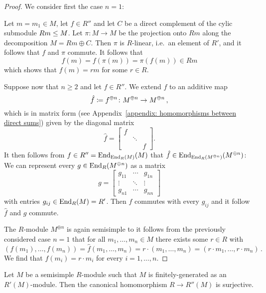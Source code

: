 \begin{proof}
  We consider first the case $n = 1$:
  
  Let $m = m_1 \in M$, let $f \in R''$ and let $C$ be a direct complement of the cylic submodule $Rm \leq M$.
  Let $\pi \colon M \to M$ be the projection onto $Rm$ along the decomposition $M = Rm \oplus C$.
  Then $\pi$ is $R$-linear, i.e.\ an element of $R'$, and it follows that $f$ and $\pi$ commute.
  It follows that
  \[
        f(m)
    =   f(\pi(m))
    =   \pi(f(m))
    \in Rm
  \]
  which shows that $f(m) = rm$ for some $r \in R$.
  
  Suppose now that $n \geq 2$ and let $f \in R''$.
  We extend $f$ to an additive map
  \[
              \hat{f}
    \coloneqq  f^{\oplus n}
    \colon    M^{\oplus n}
    \to       M^{\oplus n} \,,
  \]
  which is in matrix form (see Appendix~\ref{appendix: homomorphisms between direct sums}) given by the diagonal matrix
  \[
      \hat{f}
    = \begin{bmatrix}
        f &         &   \\  
          & \ddots  &   \\
          &         & f
      \end{bmatrix}.
  \]
  It then follows from $f \in R'' = \operatorname{End}_{\operatorname{End}_R(M)}(M)$ that $\hat{f} \in \operatorname{End}_{\operatorname{End}_R(M^{\oplus n})}(M^{\oplus n})$:
  We can represent every $g \in \operatorname{End}_R(M^{\oplus n})$ as a matrix
  \[
      g
    = \begin{bmatrix}
        g_{11}  & \cdots  & g_{1n}  \\
        \vdots  & \ddots  & \vdots  \\
        g_{n1}  & \cdots  & g_{nn}
      \end{bmatrix}
  \]
  with entries $g_{ij} \in \operatorname{End}_R(M) = R'$.
  Then $f$ commutes with every $g_{ij}$ and it follow $\hat{f}$ and $g$ commute.
  
  The $R$-module $M^{\oplus n}$ is again semisimple to it follows from the previously considered case $n = 1$ that for all $m_1, \dotsc, m_n \in M$ there exists some $r \in R$ with
  \[
      (f(m_1), \dotsc, f(m_n))
    = \hat{f}(m_1, \dotsc, m_n)
    = r \cdot (m_1, \dotsc, m_n)
    = (r \cdot m_1, \dotsc, r \cdot m_n) \,.
  \]
  We find that $f(m_i) = r \cdot m_i$ for every $i = 1, \dotsc, n$.
\end{proof}


\begin{corollary}
  \label{corollary: balanced if finitely generated}
  Let $M$ be a semisimple $R$-module such that $M$ is finitely-generated as an $R'(M)$-module.
  Then the canonical homomorphism $R \to R''(M)$ is surjective.
\end{corollary}


